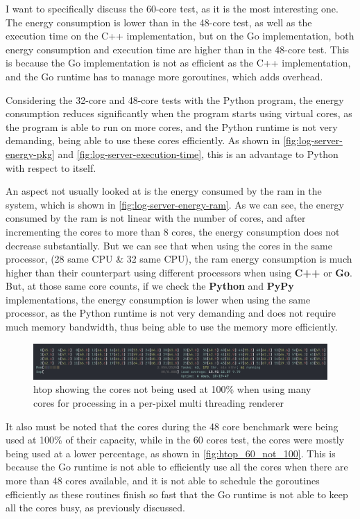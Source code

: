 I want to specifically discuss the 60-core test, as it is the most interesting one. The energy consumption is lower than in the 48-core test, as well as the execution time on the C++ implementation, but on the Go implementation, both energy consumption and execution time are higher than in the 48-core test. This is because the Go implementation is not as efficient as the C++ implementation, and the Go runtime has to manage more goroutines, which adds overhead.

Considering the 32-core and 48-core tests with the Python program, the energy consumption reduces significantly when the program starts using virtual cores, as the program is able to run on more cores, and the Python runtime is not very demanding, being able to use these cores efficiently. As shown in \autoref{fig:log-server-energy-pkg} and \autoref{fig:log-server-execution-time}, this is an advantage to Python with respect to itself.

An aspect not usually looked at is the energy consumed by the \gls{ram} in the system, which is shown in \autoref{fig:log-server-energy-ram}. As we can see, the energy consumed by the \gls{ram} is not linear with the number of cores, and after incrementing the cores to more than $8$ cores, the energy consumption does not decrease substantially. But we can see that when using the cores in the same processor, (28 same CPU \& 32 same CPU), the \gls{ram} energy consumption is much higher than their counterpart using different processors when using \textbf{C++} or \textbf{Go}. But, at those same core counts, if we check the \textbf{Python} and \textbf{PyPy} implementations, the energy consumption is lower when using the same processor, as the Python runtime is not very demanding and does not require much memory bandwidth, thus being able to use the memory more efficiently.


\begin{figure}
    \centering
    \includegraphics[width=1\linewidth]{img/htop_not_running_100_60_cores.png}
    \caption[Core usage per pixel renderer]{\gls{htop} showing the cores not being used at 100\% when using many cores for processing in a per-pixel multi threading renderer }
    \label{fig:htop_60_not_100}
\end{figure}

It also must be noted that the cores during the 48 core benchmark were being used at 100\% of their capacity, while in the 60 cores test, the cores were mostly being used at a lower percentage, as shown in \autoref{fig:htop_60_not_100}. This is because the Go runtime is not able to efficiently use all the cores when there are more than 48 cores available, and it is not able to schedule the goroutines efficiently as these routines finish so fast that the Go runtime is not able to keep all the cores busy, as previously discussed.


